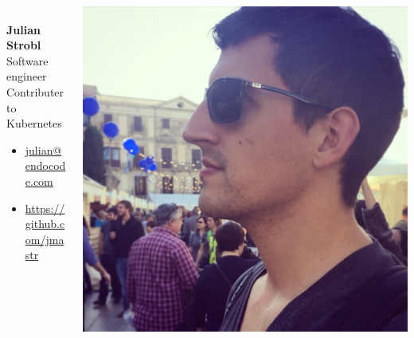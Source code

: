 \begin{frame} %
\begin{columns}[c] %
\begin{column}{.6\textwidth}
{\color{white}\Large
\\\textbf{Julian Strobl}}\\[.5cm]
Software engineer\\
Contributer to Kubernetes\\
\begin{itemize}
\tightlist
\item
  \url{julian@endocode.com}
\item
  \url{https://github.com/jmastr}
\end{itemize}
\end{column}
\hfill
\begin{column}{.4\textwidth}
\centering
\includegraphics[width=.8\textwidth]{author.jpg}
\end{column}
\end{columns}
\end{frame}

